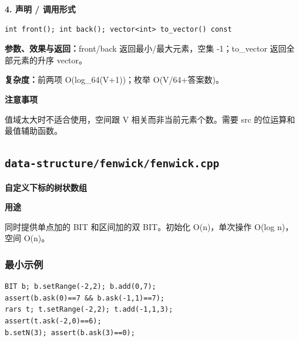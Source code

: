 \documentclass[UTF8,a4paper,10pt]{ctexart}
\newcommand{\TemplUsage}[1]{\textbf{用途}\par #1\par}
\newcommand{\TemplNote}[1]{\textbf{注意事项}\par #1\par}
\begin{document}
\noindent\begin{minipage}{\textwidth}
\textbf{4. 声明 / 调用形式}
\begin{lstlisting}
int front(); int back(); vector<int> to_vector() const
\end{lstlisting}
\textbf{参数、效果与返回：}front/back 返回最小/最大元素，空集 -1；to\_vector 返回全部元素的升序 vector。

\textbf{复杂度：}前两项 O(log\_64(V+1))；枚举 O(V/64+答案数)。

\TemplNote{值域太大时不适合使用，空间跟 V 相关而非当前元素个数。需要 src 的位运算和最值辅助函数。}
\end{minipage}\par\vspace{0.4em}
\clearpage
\subsection{\texttt{data-structure/fenwick/fenwick.cpp}}
\textbf{自定义下标的树状数组}\par
\TemplUsage{同时提供单点加的 BIT 和区间加的双 BIT。初始化 O(n)，单次操作 O(log n)，空间 O(n)。}
\subsubsection*{最小示例}
\begin{lstlisting}
BIT b; b.setRange(-2,2); b.add(0,7);
assert(b.ask(0)==7 && b.ask(-1,1)==7);
rars t; t.setRange(-2,2); t.add(-1,1,3);
assert(t.ask(-2,0)==6);
b.setN(3); assert(b.ask(3)==0);
\end{lstlisting}
\end{document}
